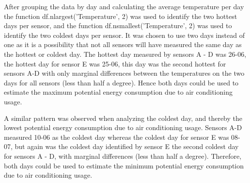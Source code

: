 \documentclass[a4paper,12pt]{article} %
\begin{document}
\begin{enumerate}
After grouping the data by day and calculating the average temperature per day the function df.nlargest('Temperature', 2) was used to identify the two hottest days per sensor, and the function df.nsmallest('Temperature', 2) was used to identify the two coldest days per sensor.  It was chosen to use two days instead of one as it is a possibility that not all sensors will have measured the same day as the hottest or coldest day. The hottest day measured by sensors A - D was 26-06, the hottest day for sensor E was 25-06, this day was the second hottest for sensors A-D with only marginal differences between the temperatures on the two days for all sensors (less than half a degree). Hence both days could be used to estimate the maximum potential energy consumption due to air conditioning usage. 

A similar pattern was observed when analyzing the coldest day, and thereby the lowest potential energy consumption due to air conditioning usage. Sensors A-D measured 10-06 as the coldest day whereas the coldest day for sensor E was 08-07, but again was the coldest day identified by sensor E the second coldest day for sensors A - D, with marginal differences (less than half a degree). Therefore, both days could be used to estimate the minimum potential energy consumption due to air conditioning usage. 



\end{enumerate}







\end{document}
